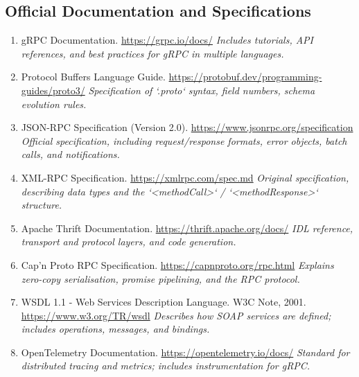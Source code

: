 \documentclass[10pt,a4paper]{article}
\begin{document}
\subsection*{Official Documentation and Specifications}
\begin{enumerate}
    \item gRPC Documentation. \url{https://grpc.io/docs/}  
    \textit{Includes tutorials, API references, and best practices for gRPC in multiple languages.}
    
    \item Protocol Buffers Language Guide. \url{https://protobuf.dev/programming-guides/proto3/}  
    \textit{Specification of `.proto` syntax, field numbers, schema evolution rules.}
    
    \item JSON-RPC Specification (Version 2.0). \url{https://www.jsonrpc.org/specification}  
    \textit{Official specification, including request/response formats, error objects, batch calls, and notifications.}
    
    \item XML-RPC Specification. \url{https://xmlrpc.com/spec.md}  
    \textit{Original specification, describing data types and the `<methodCall>` / `<methodResponse>` structure.}
    
    \item Apache Thrift Documentation. \url{https://thrift.apache.org/docs/}  
    \textit{IDL reference, transport and protocol layers, and code generation.}
    
    \item Cap'n Proto RPC Specification. \url{https://capnproto.org/rpc.html}  
    \textit{Explains zero-copy serialisation, promise pipelining, and the RPC protocol.}
    
    \item WSDL 1.1 - Web Services Description Language. W3C Note, 2001. \url{https://www.w3.org/TR/wsdl}  
    \textit{Describes how SOAP services are defined; includes operations, messages, and bindings.}
    
    \item OpenTelemetry Documentation. \url{https://opentelemetry.io/docs/}  
    \textit{Standard for distributed tracing and metrics; includes instrumentation for gRPC.}
\end{enumerate}
\end{document}
